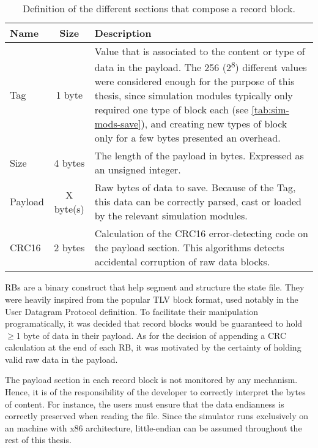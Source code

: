 {\begin{table}[h]
	\vspace{12pt}
	\centering
	\begin{tabularx}{\linewidth}{l c X}
		\toprule
		{\bfseries Name}&{\bfseries Size}&{\bfseries Description}\\
		\midrule
		Tag & 1 byte & Value that is associated to the content or type of data in the payload. The 256 (2\textsuperscript{8}) different values were considered enough for the purpose of this thesis, since simulation modules typically only required one type of block each (see \autoref{tab:sim-mods-save}), and creating new types of block only for a few bytes presented an overhead.\\
		\midrule
		Size & 4 bytes & The length of the payload in bytes. Expressed as an unsigned integer.\\
		\midrule
		Payload & {X byte(s)} & Raw bytes of data to save. Because of the Tag, this data can be correctly parsed, cast or loaded by the relevant simulation modules.\\
		\midrule
		CRC16 & 2 bytes & Calculation of the CRC16 error-detecting code on the payload section. This algorithms detects accidental corruption of raw data blocks.\\
		\bottomrule	
	\end{tabularx}
	\caption{Definition of the different sections that compose a record block.}
	\label{tab:rb-fields}
\end{table}

RBs are a binary construct that help segment and structure the state file. They were heavily inspired from the popular \gls{TLV} block format, used notably in the User Datagram Protocol definition\cite{report:udp}. To facilitate their manipulation programatically, it was decided that record blocks would be guaranteed to hold $\geq$1 byte of data in their payload. As for the decision of appending a \gls{CRC} calculation at the end of each RB, it was motivated by the certainty of holding valid raw data in the payload.

The payload section in each record block is not monitored by any mechanism. Hence, it is of the responsibility of the developer to correctly interpret the bytes of content. For instance, the users must ensure that the data endianness is correctly preserved when reading the file. Since the simulator runs exclusively on an machine with x86 architecture, little-endian can be assumed throughout the rest of this thesis.

}
